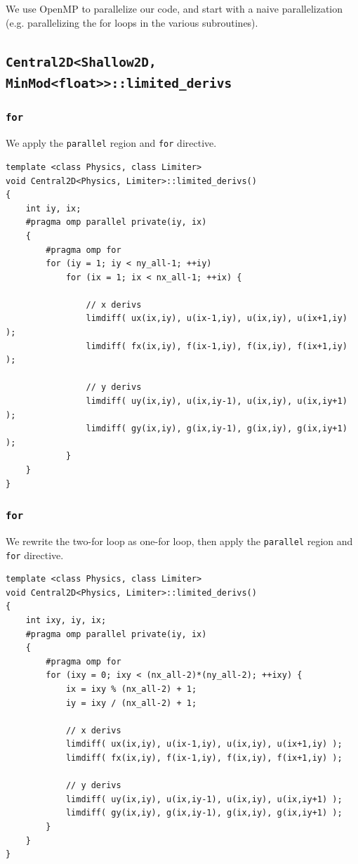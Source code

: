 \documentclass[12pt]{article}
\numberwithin{equation}{section}
\begin{document}
We use OpenMP to parallelize our code, and start with a naive parallelization (e.g. parallelizing the for loops in the various subroutines).

\subsection{\texttt{Central2D<Shallow2D, MinMod<float>>::limited\_derivs}}

\subsubsection{\texttt{for}}

We apply the \texttt{parallel} region and \texttt{for} directive.
\begin{verbatim}
template <class Physics, class Limiter>
void Central2D<Physics, Limiter>::limited_derivs()
{
    int iy, ix;
    #pragma omp parallel private(iy, ix)
    {
        #pragma omp for
        for (iy = 1; iy < ny_all-1; ++iy)
            for (ix = 1; ix < nx_all-1; ++ix) {

                // x derivs
                limdiff( ux(ix,iy), u(ix-1,iy), u(ix,iy), u(ix+1,iy) );
                limdiff( fx(ix,iy), f(ix-1,iy), f(ix,iy), f(ix+1,iy) );

                // y derivs
                limdiff( uy(ix,iy), u(ix,iy-1), u(ix,iy), u(ix,iy+1) );
                limdiff( gy(ix,iy), g(ix,iy-1), g(ix,iy), g(ix,iy+1) );
            }
    }
}
\end{verbatim}

\subsubsection{\texttt{for}}

We rewrite the two-for loop as one-for loop, then apply the \texttt{parallel} region and \texttt{for} directive.
\begin{verbatim}
template <class Physics, class Limiter>
void Central2D<Physics, Limiter>::limited_derivs()
{
    int ixy, iy, ix;
    #pragma omp parallel private(iy, ix)
    {
        #pragma omp for
        for (ixy = 0; ixy < (nx_all-2)*(ny_all-2); ++ixy) {
            ix = ixy % (nx_all-2) + 1;
            iy = ixy / (nx_all-2) + 1;

            // x derivs
            limdiff( ux(ix,iy), u(ix-1,iy), u(ix,iy), u(ix+1,iy) );
            limdiff( fx(ix,iy), f(ix-1,iy), f(ix,iy), f(ix+1,iy) );

            // y derivs
            limdiff( uy(ix,iy), u(ix,iy-1), u(ix,iy), u(ix,iy+1) );
            limdiff( gy(ix,iy), g(ix,iy-1), g(ix,iy), g(ix,iy+1) );
        }
    }
}
\end{verbatim}
\end{document}
